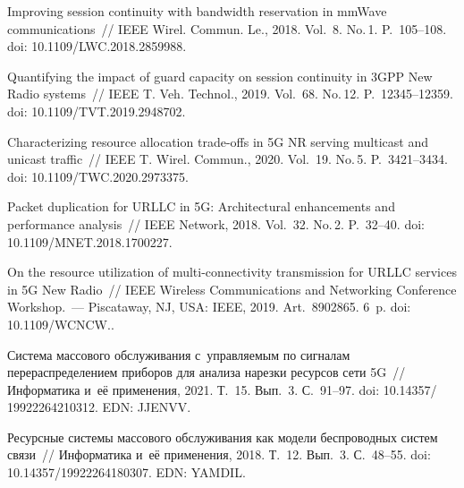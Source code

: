 \begin{multicols}{2}
{{\begin{thebibliography}{99}
 Improving session continuity with bandwidth reservation in 
mm{W}ave communications~// IEEE Wirel. Commun. Le., 2018. Vol.~8. 
No.\,1. P.~105--108. doi: 10.1109/LWC.2018.2859988.

 Quantifying the impact of guard capacity on 
session continuity in 3GPP New Radio systems~// IEEE T. Veh. 
Technol., 2019. Vol.~68. No.\,12. P.~12345--12359. doi: 10.1109/TVT.2019.2948702.

Characterizing resource allocation trade-offs in 5G NR serving multicast and 
unicast traffic~// IEEE T. Wirel. Commun., 2020. Vol.~19. 
No.\,5. P.~3421--3434. doi: 10.1109/TWC.2020.2973375.





Packet duplication for URLLC in 5G: Architectural enhancements and performance 
analysis~// IEEE Network, 2018. Vol.~32. No.\,2. P.~32--40. doi: 10.1109/MNET.2018.1700227.

On the resource utilization of multi-connectivity transmission for URLLC 
services in 5G New Radio~// IEEE Wireless Communications and Networking 
Conference Workshop.~--- Piscataway, NJ, USA: IEEE, 2019. Art.~8902865. 
6~p. doi: 10.1109/\mbox{WCNCW}..

 Система 
массового обслуживания с~управляемым по сигналам перераспределением приборов для 
анализа нарезки ресурсов сети 5G~// Информатика и~её применения, 2021. Т.~15. Вып.~3. 
С.~91--97. doi: 
10.14357/ 19922264210312. EDN: JJENVV.

Ресурсные системы массового обслуживания как модели беспроводных сис\-тем связи~// 
Информатика и~её применения, 2018. Т.~12. Вып.~3. С.~48--55. doi: 
10.14357/19922264180307. EDN: YAMDIL.


\end{thebibliography}}}
\end{multicols}
